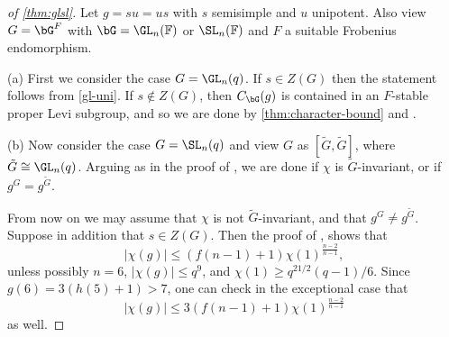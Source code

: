 \documentclass[eqthmnum,nocolour,skinny]{jt-calcs}
\begin{document}
\begin{proof}[of \cref{thm:glsl}]
Let $g=su=us$ with $s$ semisimple and $u$ unipotent. Also view $G = \bG^F$ with $\bG = \GL_n(\mathbb{F})$ or $\SL_n(\mathbb{F})$ and $F$ a suitable Frobenius 
endomorphism.

(a) First we consider the case $G = \GL_n(q)$. If $s \in Z(G)$ then the statement follows from \cref{gl-uni}. If $s \notin Z(G)$, then $C_{\bG}(g)$ is contained in an $F$-stable proper Levi subgroup, and
so we are done by  \cref{thm:character-bound} and \cite[Prop.~4.3]{bezrukavnikov-liebeck-shalev-tiep:2017:character-bounds-grps-Lie-type}.

(b) Now consider the case $G = \SL_n(q)$ and view $G$ as $[\tilde G,\tilde G]$, where $\tilde G \cong \GL_n(q)$. Arguing as in the proof of
\cite[Thm.~1.5]{bezrukavnikov-liebeck-shalev-tiep:2017:character-bounds-grps-Lie-type}, we are done if $\chi$ is $\tilde G$-invariant, or if 
$g^G = g^{\tilde G}$. 

From now on we may assume that $\chi$ is not $\tilde G$-invariant, and that $g^G \neq g^{\tilde G}$.
Suppose in addition that $s \in Z(G)$. Then the proof of \cite[Thm.~1.5]{bezrukavnikov-liebeck-shalev-tiep:2017:character-bounds-grps-Lie-type},
shows that 
\begin{equation*}
|\chi(g)| \leq (f(n-1)+1)\chi(1)^{\frac{n-2}{n-1}},
\end{equation*}
unless possibly $n=6$, $|\chi(g)| \leq q^9$, and $\chi(1) \geq q^{21/2}(q-1)/6$. Since $g(6) = 3(h(5)+1) > 7$, one can check in the exceptional case
that
\begin{equation*} 
|\chi(g)| \leq 3(f(n-1)+1)\chi(1)^{\frac{n-2}{n-1}}
\end{equation*}
as well.


\end{proof}
\end{document}
